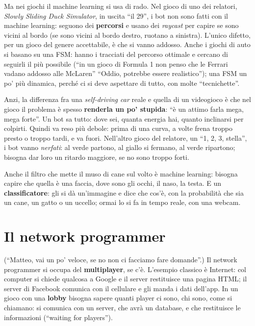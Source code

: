 Ma nei giochi il machine learning si usa di rado. Nel gioco di uno dei
relatori, \emph{Slowly Sliding Duck Simulator}, in uscita ``il 29'', i bot non
sono fatti con il machine learning: seguono dei \textbf{percorsi} e usano dei
\emph{raycast} per capire se sono vicini al bordo (se sono vicini al bordo
destro, ruotano a sinistra). L'unico difetto, per un gioco del genere
accettabile, è che si vanno addosso. Anche i giochi di auto si basano su una
FSM: hanno i tracciati del percorso ottimale e cercano di seguirli il più
possibile (``in un gioco di Formula 1 non penso che le Ferrari vadano addosso
alle McLaren'' ``Oddio, potrebbe essere realistico''); una FSM un po' più
dinamica, perché ci si deve aspettare di tutto, con molte ``tecnichette''.

Anzi, la differenza fra una \emph{self-driving car} reale e quella di un
videogioco è che nel gioco il problema è spesso \textbf{renderla un po'
stupida}: ``è un attimo farla mega, mega forte''. Un bot sa tutto: dove sei,
quanta energia hai, quanto inclinarsi per colpirti. Quindi va reso più debole:
prima di una curva, a volte frena troppo presto o troppo tardi, e va fuori.
Nell'altro gioco del relatore, un ``1, 2, 3, stella'', i bot vanno
\emph{nerfati}: al verde partono, al giallo si fermano, al verde ripartono;
bisogna dar loro un ritardo maggiore, se no sono troppo forti.

Anche il filtro che mette il muso di cane sul volto è machine learning:
bisogna capire che quella è una faccia, dove sono gli occhi, il naso, la
testa. E un \textbf{classificatore}: gli si dà un'immagine e dice che cos'è,
con la probabilità che sia un cane, un gatto o un uccello; ormai lo si fa in
tempo reale, con una webcam.

\section{Il network programmer}
\label{p5:sec:network}

(``Matteo, vai un po' veloce, se no non ci facciamo fare domande''.) Il
network programmer si occupa del \textbf{multiplayer}, se c'è. L'esempio
classico è Internet: col computer si chiede qualcosa a Google e il server
restituisce una pagina HTML; il server di Facebook comunica con il cellulare e
gli manda i dati dell'app. In un gioco con una \textbf{lobby} bisogna sapere
quanti player ci sono, chi sono, come si chiamano: si comunica con un server,
che avrà un database, e che restituisce le informazioni (``waiting for
players'').

